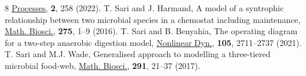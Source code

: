 \documentclass[runningheads]{llncs}
\begin{document}
\begin{thebibliography}{8}
\newblock \href{https://doi.org/10.3390/pr10020258}{Processes}, \textbf{2}, 258 (2022).\vspace*{2pt}
\newblock T. Sari and J. Harmand,
\newblock A model of a syntrophic relationship between two microbial species in a chemostat including maintenance,
\newblock \href{https://doi.org/10.1016/j.mbs.2016.02.008}{Math. Biosci.}, \textbf{275},  1--9 (2016).\vspace*{2pt}
\newblock T. Sari and B. Benyahia,
\newblock The operating diagram for a two-step anaerobic digestion model,
\newblock \href{http://dx.doi.org/10.1007/s11071-021-06722-7}{Nonlinear Dyn.}, \textbf{105}, 2711--2737 (2021). \vspace*{2pt}
\newblock T. Sari and M.J. Wade,
\newblock Generalised approach to modelling a three-tiered microbial food-web,
\newblock \href{http://dx.doi.org/10.1016/j.mbs.2017.07.005}{Math. Biosci.}, \textbf{291}, 21--37 (2017). \vspace*{2pt}
\end{thebibliography}
\end{document}

